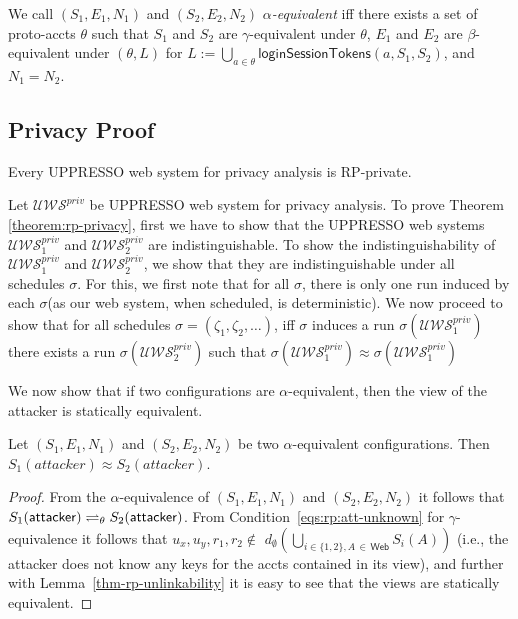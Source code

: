   \begin{definition}
    We call $(S_1,E_1,N_1)$ and $(S_2,E_2,N_2)$
    \emph{$\alpha$-equivalent} iff there exists a set of 
    proto-accts $\theta$ such that $S_1$ and $S_2$ are
    $\gamma$-equivalent under $\theta$, $E_1$ and $E_2$ are
    $\beta$-equivalent under $(\theta,L)$ 
    for $L := \bigcup_{a\in\theta} \mathsf{loginSessionTokens}(a,S_1,S_2)$, 
    and $N_1 = N_2$.
  \end{definition}
  
  \subsection{Privacy Proof}
  
  \begin{theorem} \label{theorem:rp-privacy}
    Every UPPRESSO web system for privacy analysis is RP-private.
  \end{theorem}
  
  Let $\mathcal{U\!W\!S}^{priv}$ be UPPRESSO web system for privacy analysis.
  To prove Theorem \ref{theorem:rp-privacy}, first we have to show that 
  the UPPRESSO web systems $\mathcal{U\!W\!S}^{priv}_1$ and 
  $\mathcal{U\!W\!S}^{priv}_2$ are indistinguishable. To show 
  the indistinguishability of $\mathcal{U\!W\!S}^{priv}_1$ and 
  $\mathcal{U\!W\!S}^{priv}_2$, we show that they are 
  indistinguishable under all schedules $\sigma$. For this, 
  we first note that for all $\sigma$, there is only one run 
  induced by each $\sigma$(as our web system, when scheduled, is deterministic).
  We now proceed to show that for all schedules $\sigma=(\zeta _1, \zeta_2,\dots)$, 
  iff $\sigma$ induces a run $\sigma(\mathcal{U\!W\!S}^{priv}_1)$ 
  there exists a run $\sigma(\mathcal{U\!W\!S}^{priv}_2)$ 
  such that $\sigma(\mathcal{U\!W\!S}^{priv}_1)\approx\sigma(\mathcal{U\!W\!S}^{priv}_1)$
  
  We now show that if two configurations are $\alpha$-equivalent, 
  then the view of the attacker is statically equivalent.
  
  \begin{lemma}\label{lemma:statically-equivalent}
    Let $(S_1,E_1,N_1)$ and $(S_2,E_2,N_2)$ be two 
    $\alpha$-equivalent configurations. 
    Then $S_1(attacker)\approx S_2(attacker)$.
  \end{lemma}
  \begin{proof}
    From the $\alpha$-equivalence of $(S_1,E_1,N_1)$ and 
    $(S_2,E_2,N_2)$ it follows that $S_1(\mathsf{attacker}) 
    \rightleftharpoons_{\theta} S_2(\mathsf{attacker})$.
    From Condition~\ref{eqs:rp:att-unknown} for 
    $\gamma$-equivalence it follows that
    $u_x, u_y, r_1, r_2 \not\in $
    $d_\emptyset(\bigcup_{i\in\{1,2\},A\,\in\,\mathsf{Web}}S_i(A))$ 
    (i.e., the attacker does not know any keys for the accts 
    contained in its view), and further with Lemma~\ref{thm-rp-unlinkability} 
    it is easy to see that the views are statically equivalent.
  \end{proof}

